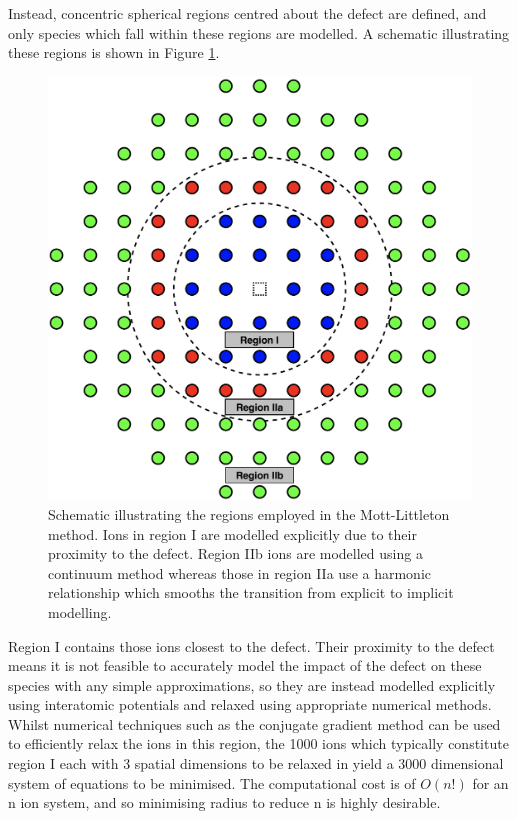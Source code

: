 Instead, concentric spherical regions centred about the defect are defined, and only species which fall within these regions are modelled.
A schematic illustrating these regions is shown in Figure \ref{fig:mott}. 

\begin{figure}
  \centering
  \includegraphics[width = 0.9\linewidth]{figures/Mott-Littleton}
  \caption[Schematic illustrating the regions employed in the Mott-Littleton method.]{Schematic illustrating the regions employed in the Mott-Littleton method. Ions in region I are modelled explicitly due to their proximity to the defect. Region IIb ions are modelled using a continuum method whereas those in region IIa use a harmonic relationship which smooths the transition from explicit to implicit modelling.}
  \label{fig:mott}
\end{figure}

Region I contains those ions closest to the defect.
Their proximity to the defect means it is not feasible to accurately model the impact of the defect on these species with any simple approximations, so they are instead modelled explicitly using interatomic potentials and relaxed using appropriate numerical methods.
Whilst numerical techniques such as the conjugate gradient method can be used to efficiently relax the ions in this region, the 1000 ions which typically constitute region I each with 3 spatial dimensions to be relaxed in yield a 3000 dimensional system of equations to be minimised.
The computational cost is of $O(n!)$ for an n ion system, and so minimising radius to reduce n is highly desirable.

